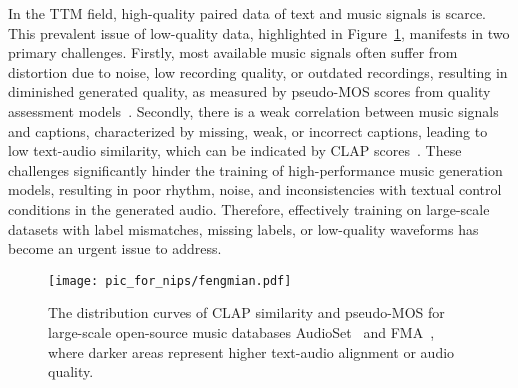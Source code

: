 In the TTM field, high-quality paired data of text and music signals is scarce. This prevalent issue of low-quality data, highlighted in Figure~\ref{fig:enter-label}, manifests in two primary challenges. Firstly, most available music signals often suffer from distortion due to noise, low recording quality, or outdated recordings, resulting in diminished generated quality, as measured by pseudo-MOS scores from quality assessment models~\citep{ragano2023audio}. Secondly, there is a weak correlation between music signals and captions, characterized by missing, weak, or incorrect captions, leading to low text-audio similarity, which can be indicated by CLAP scores~\citep{laionclap2023}. These challenges significantly hinder the training of high-performance music generation models, resulting in poor rhythm, noise, and inconsistencies with textual control conditions in the generated audio. Therefore, effectively training on large-scale datasets with label mismatches, missing labels, or low-quality waveforms has become an urgent issue to address.
\begin{figure}
    \centering
    \texttt{[image: pic\_for\_nips/fengmian.pdf]}
    \caption{The distribution curves of CLAP similarity and pseudo-MOS for large-scale open-source music databases AudioSet~\citep{defferrard2016fma} and FMA~\citep{defferrard2016fma}, where darker areas represent higher text-audio alignment or audio quality.}
    \label{fig:enter-label}
\end{figure}


